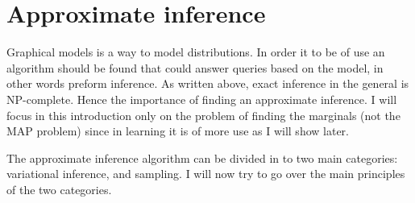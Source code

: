 \section{Approximate inference}
\label{sec:approx}
Graphical models is a way to model distributions.
In order it to be of use an algorithm should be found that could answer queries based on the model, in other words preform inference.
As written above, exact inference in the general is NP-complete.
Hence the importance of finding an approximate inference.
I will focus in this introduction only on the problem of finding the marginals (not the MAP problem) since in learning it is of more use as I will show later.

The approximate inference algorithm can be divided in to two main categories: variational inference, and sampling.
I will now try to go over the main principles of the two categories.
